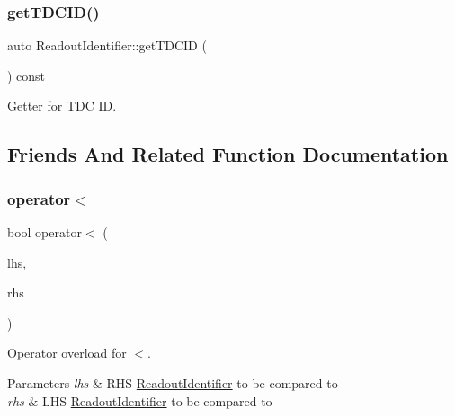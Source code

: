 \subsubsection{\texorpdfstring{get\+T\+D\+C\+I\+D()}{getTDCID()}}
{\footnotesize\ttfamily auto Readout\+Identifier\+::get\+T\+D\+C\+ID (\begin{DoxyParamCaption}{ }\end{DoxyParamCaption}) const\hspace{0.3cm}{\ttfamily [inline]}}



Getter for T\+DC ID. 



\subsection{Friends And Related Function Documentation}
\mbox{\label{class_readout_identifier_aa0d096b09bfc6a21f2c29ec777e101f8}} 
\subsubsection{\texorpdfstring{operator$<$}{operator<}}
{\footnotesize\ttfamily bool operator$<$ (\begin{DoxyParamCaption}\item[{const \hyperlink{class_readout_identifier}{Readout\+Identifier} \&}]{lhs,  }\item[{const \hyperlink{class_readout_identifier}{Readout\+Identifier} \&}]{rhs }\end{DoxyParamCaption})\hspace{0.3cm}{\ttfamily [friend]}}



Operator overload for $<$. 


\begin{DoxyParams}{Parameters}
{\em lhs} & R\+HS \hyperlink{class_readout_identifier}{Readout\+Identifier} to be compared to \\
\hline
{\em rhs} & L\+HS \hyperlink{class_readout_identifier}{Readout\+Identifier} to be compared to \\
\hline
\end{DoxyParams}
\mbox{\label{class_readout_identifier_a62474a342fbe3d79da5b8a869d95e72e}} 
